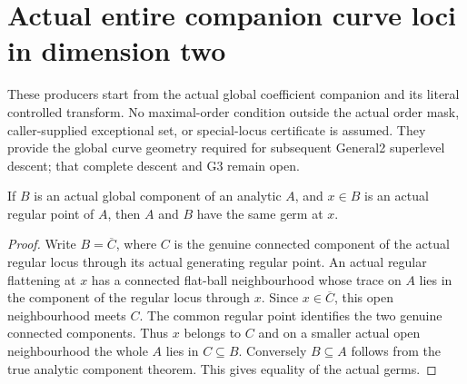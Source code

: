 \section{Actual entire companion curve loci in dimension two}

These producers start from the actual global coefficient companion and its
literal controlled transform. No maximal-order condition outside the actual
order mask, caller-supplied exceptional set, or special-locus certificate is
assumed. They provide the global curve geometry required for subsequent
General2 superlevel descent; that complete descent and G3 remain open.

\begin{lemma}
\label{hir:general-two-curve-component-germ}
\leanok
If $B$ is an actual global component of an analytic $A$, and $x\in B$ is an
actual regular point of $A$, then $A$ and $B$ have the same germ at $x$.
\end{lemma}
\begin{proof}
Write $B=\overline C$, where $C$ is the genuine connected component of
the actual regular locus through its actual generating regular point.
An actual regular flattening at $x$ has a connected flat-ball neighbourhood
whose trace on $A$ lies in the component of the regular locus through $x$.
Since $x\in\overline C$, this open neighbourhood meets $C$. The common
regular point identifies the two genuine connected components. Thus $x$
belongs to $C$ and on a smaller actual open neighbourhood the whole $A$
lies in $C\subseteq B$. Conversely $B\subseteq A$ follows from the true
analytic component theorem. This gives equality of the actual germs.
\end{proof}

